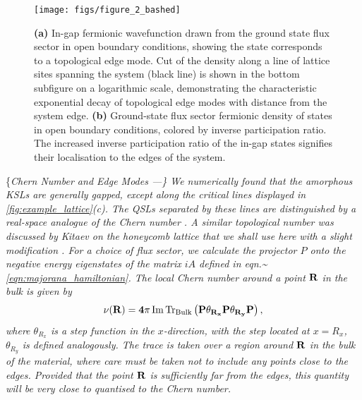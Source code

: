 \par

\begin{figure}
    \centering
    \texttt{[image: figs/figure\_2\_bashed]}
    \caption{\textbf{(a)} In-gap fermionic wavefunction drawn from the ground state flux sector in open boundary conditions, showing the state corresponds to a topological edge mode. Cut of the density along a line of lattice sites spanning the system (black line) is shown in the bottom subfigure on a logarithmic scale, demonstrating the characteristic exponential decay of topological edge modes with distance from the system edge. \textbf{(b)} Ground-state flux sector fermionic density of states in open boundary conditions, colored by inverse participation ratio. The increased inverse participation ratio of the in-gap states signifies their localisation to the edges of the system.}
    \label{fig:edge_modes}
\end{figure}

\{\it Chern Number and Edge Modes ---\} We numerically found that the
amorphous KSLs are generally gapped, except along the critical lines
displayed in \ref{fig:example_lattice}(c). The QSLs separated by these
lines are distinguished by a real-space analogue of the Chern number
\cite{bianco_mapping_2011,Hastings_Almost_2010}. A similar topological
number was discussed by Kitaev on the honeycomb lattice
\cite{kitaevAnyonsExactlySolved2006} that we shall use here with a
slight modification
\cite{peru_preprint, mitchellAmorphousTopologicalInsulators2018}. For a
choice of flux sector, we calculate the projector \(P\) onto the
negative energy eigenstates of the matrix \(iA\) defined in
eqn.\textasciitilde{}\ref{eqn:majorana_hamiltonian}. The local Chern
number around a point \(\bf R\) in the bulk is given by \begin{align}
    \nu (\bf R) = 4\pi \Im \Tr_{\textup{Bulk}} 
    \left ( 
    P\theta_{R_x} P \theta_{R_y} P
    \right ),
\end{align} where \(\theta_{R_x}\) is a step function in the
\(x\)-direction, with the step located at \(x = R_x\), \(\theta_{R_y}\)
is defined analogously. The trace is taken over a region around
\(\bf R\) in the bulk of the material, where care must be taken not to
include any points close to the edges. Provided that the point \(\bf R\)
is sufficiently far from the edges, this quantity will be very close to
quantised to the Chern number.

\par

